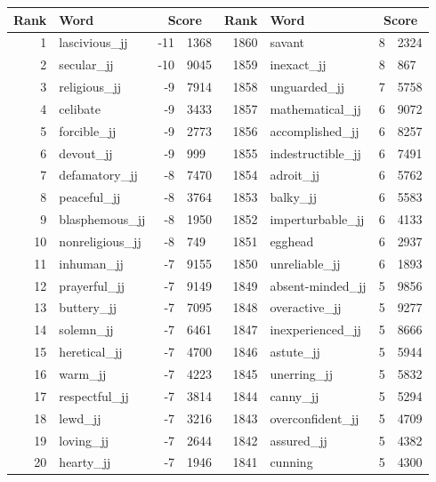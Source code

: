 \begin{table}[tbp]
    \begin{tabular}{| rlr@{.}l | rlr@{.}l |}
    \hline
    \textbf{Rank} & \textbf{Word} & \multicolumn{2}{c|}{\textbf{Score}} & \textbf{Rank} & \textbf{Word} & \multicolumn{2}{c|}{\textbf{Score}} \\
    \hline
    1 & lascivious\_jj & -11 & 1368    &    1860 & savant & 8 & 2324 \\
    2 & secular\_jj & -10 & 9045    &    1859 & inexact\_jj & 8 & 867 \\
    3 & religious\_jj & -9 & 7914    &    1858 & unguarded\_jj & 7 & 5758 \\
    4 & celibate & -9 & 3433    &    1857 & mathematical\_jj & 6 & 9072 \\
    5 & forcible\_jj & -9 & 2773    &    1856 & accomplished\_jj & 6 & 8257 \\
    6 & devout\_jj & -9 & 999    &    1855 & indestructible\_jj & 6 & 7491 \\
    7 & defamatory\_jj & -8 & 7470    &    1854 & adroit\_jj & 6 & 5762 \\
    8 & peaceful\_jj & -8 & 3764    &    1853 & balky\_jj & 6 & 5583 \\
    9 & blasphemous\_jj & -8 & 1950    &    1852 & imperturbable\_jj & 6 & 4133 \\
    10 & nonreligious\_jj & -8 & 749    &    1851 & egghead & 6 & 2937 \\
    11 & inhuman\_jj & -7 & 9155    &    1850 & unreliable\_jj & 6 & 1893 \\
    12 & prayerful\_jj & -7 & 9149    &    1849 & absent-minded\_jj & 5 & 9856 \\
    13 & buttery\_jj & -7 & 7095    &    1848 & overactive\_jj & 5 & 9277 \\
    14 & solemn\_jj & -7 & 6461    &    1847 & inexperienced\_jj & 5 & 8666 \\
    15 & heretical\_jj & -7 & 4700    &    1846 & astute\_jj & 5 & 5944 \\
    16 & warm\_jj & -7 & 4223    &    1845 & unerring\_jj & 5 & 5832 \\
    17 & respectful\_jj & -7 & 3814    &    1844 & canny\_jj & 5 & 5294 \\
    18 & lewd\_jj & -7 & 3216    &    1843 & overconfident\_jj & 5 & 4709 \\
    19 & loving\_jj & -7 & 2644    &    1842 & assured\_jj & 5 & 4382 \\
    20 & hearty\_jj & -7 & 1946    &    1841 & cunning & 5 & 4300 \\

\end{tabular}
\end{table}
